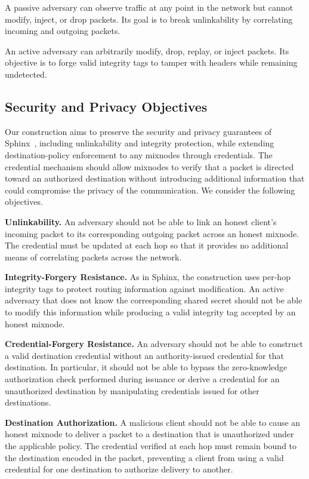 \smallskip
{}
A passive adversary can observe traffic at any point in the network but cannot modify, inject, or drop packets.
Its goal is to break unlinkability by correlating incoming and outgoing packets.

\smallskip
{}
An active adversary can arbitrarily modify, drop, replay, or inject packets.
Its objective is to forge valid integrity tags to tamper with headers while remaining undetected. 


\subsection{Security and Privacy Objectives}\label{sec:sp-objectives}

Our construction aims to preserve the security and privacy guarantees of Sphinx~\cite{sphinx}, including unlinkability and integrity protection, while extending destination-policy enforcement to any mixnodes through credentials.
The credential mechanism should allow mixnodes to verify that a packet is directed toward an authorized destination without introducing additional information that could compromise the privacy of the communication.
We consider the following objectives.

\smallskip
\noindent\textbf{Unlinkability.} An adversary should not be able to link an honest client's incoming packet to its corresponding  outgoing packet across an honest mixnode.
The credential must be updated at each hop so that it provides no additional means of correlating packets across the network.

\smallskip
\noindent\textbf{Integrity-Forgery Resistance.}
As in Sphinx, the construction uses per-hop integrity tags to protect routing information against modification.
An active adversary that does not know the corresponding shared secret should not be able to modify this information while producing a valid integrity tag accepted by an honest mixnode.

\smallskip
\noindent\textbf{Credential-Forgery Resistance.}
An adversary should not be able to construct a valid destination credential without an authority-issued credential for that destination.
In particular, it should not be able to bypass the zero-knowledge authorization check performed during issuance or derive a credential for an unauthorized destination by manipulating credentials issued for other destinations.

\smallskip
\noindent\textbf{Destination Authorization.}
A malicious client should not be able to cause an honest mixnode to deliver a packet to a destination that is unauthorized under the applicable policy.
The credential verified at each hop must remain bound to the destination encoded in the packet, preventing a client from using a valid credential for one destination to authorize delivery to another.

